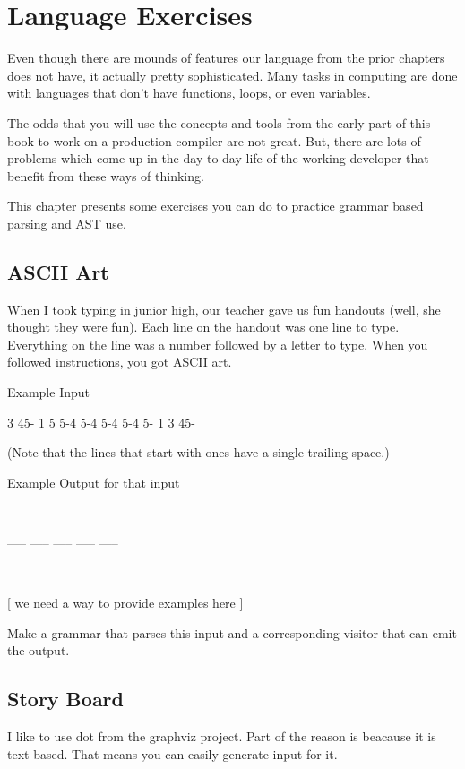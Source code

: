 \chapter{Language Exercises}

Even though there are mounds of features our language from the prior
chapters does not have, it actually pretty sophisticated. Many tasks
in computing are done with languages that don't have functions,
loops, or even variables.

The odds that you will use the concepts and tools from the early
part of this book to work on a production compiler are not great.
But, there are lots of problems which come up in the day to day
life of the working developer that benefit from these ways of
thinking.

This chapter presents some exercises you can do to practice grammar
based parsing and AST use.

\section{ASCII Art}

When I took typing in junior high, our teacher gave us fun handouts
(well, she thought they were fun). Each line on the handout was one
line to type. Everything on the line was a number followed by a letter
to type. When you followed instructions, you got ASCII art.

Example Input

3 45-
1
5 5-4 5-4 5-4 5-4 5-
1
3 45-

(Note that the lines that start with ones have a single trailing space.)

Example Output for that input

   ---------------------------------------------

     -----    -----    -----    -----    -----

   ---------------------------------------------

[ we need a way to provide examples here ]

Make a grammar that parses this input and a corresponding visitor
that can emit the output.

\section{Story Board}

I like to use dot from the graphviz project. Part of the reason is
beacause it is text based. That means you can easily generate input
for it.

